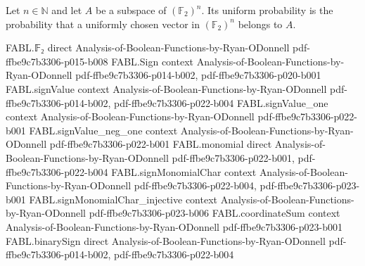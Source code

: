 \begin{definition}
\label{FABL.subspaceUniformProbability}
\leanok
{}
Let $n\in\mathbb{N}$ and let $A$ be a subspace of $(\mathbb{F}_2)^n$. Its uniform
probability is the probability that a uniformly chosen vector in $(\mathbb{F}_2)^n$
belongs to $A$.
\end{definition}

\begin{theorem}
\label{FABL.subspaceUniformProbability_eq_inversePerpendicularCard}
\leanok
{}
\proofstep
  {FABL.𝔽₂}
  {direct}
  {Analysis-of-Boolean-Functions-by-Ryan-ODonnell}
  {pdf-ffbe9c7b3306-p015-b008}
\proofstep
  {FABL.Sign}
  {context}
  {Analysis-of-Boolean-Functions-by-Ryan-ODonnell}
  {pdf-ffbe9c7b3306-p014-b002,
    pdf-ffbe9c7b3306-p020-b001}
\proofstep
  {FABL.signValue}
  {context}
  {Analysis-of-Boolean-Functions-by-Ryan-ODonnell}
  {pdf-ffbe9c7b3306-p014-b002,
    pdf-ffbe9c7b3306-p022-b004}
\proofstep
  {FABL.signValue_one}
  {context}
  {Analysis-of-Boolean-Functions-by-Ryan-ODonnell}
  {pdf-ffbe9c7b3306-p022-b001}
\proofstep
  {FABL.signValue_neg_one}
  {context}
  {Analysis-of-Boolean-Functions-by-Ryan-ODonnell}
  {pdf-ffbe9c7b3306-p022-b001}
\proofstep
  {FABL.monomial}
  {direct}
  {Analysis-of-Boolean-Functions-by-Ryan-ODonnell}
  {pdf-ffbe9c7b3306-p022-b001,
    pdf-ffbe9c7b3306-p022-b004}
\proofstep
  {FABL.signMonomialChar}
  {context}
  {Analysis-of-Boolean-Functions-by-Ryan-ODonnell}
  {pdf-ffbe9c7b3306-p022-b004,
    pdf-ffbe9c7b3306-p023-b001}
\proofstep
  {FABL.signMonomialChar_injective}
  {context}
  {Analysis-of-Boolean-Functions-by-Ryan-ODonnell}
  {pdf-ffbe9c7b3306-p023-b006}
\proofstep
  {FABL.coordinateSum}
  {context}
  {Analysis-of-Boolean-Functions-by-Ryan-ODonnell}
  {pdf-ffbe9c7b3306-p023-b001}
\proofstep
  {FABL.binarySign}
  {direct}
  {Analysis-of-Boolean-Functions-by-Ryan-ODonnell}
  {pdf-ffbe9c7b3306-p014-b002,
    pdf-ffbe9c7b3306-p022-b004}

\end{theorem}
